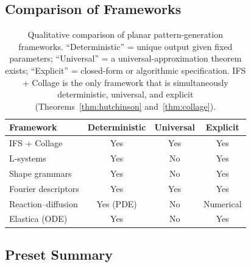 \documentclass[10pt]{amsart}
\theoremstyle{break}
\begin{document}
\subsection{Comparison of Frameworks}

\begin{table}[H]
	\centering
	{\fontsize{8}{10}\selectfont
		\begin{tabular}{|l|c|c|c|}
			\hline
			\textbf{Framework} & \textbf{Deterministic} & \textbf{Universal} & \textbf{Explicit} \\
			\hline
			IFS + Collage        & Yes       & Yes       & Yes \\
			L-systems            & Yes       & No        & Yes \\
			Shape grammars       & Yes       & No        & Yes \\
			Fourier descriptors  & Yes       & Yes       & Yes \\
			Reaction--diffusion  & Yes (PDE) & No        & Numerical \\
			Elastica (ODE)       & Yes       & No        & Yes \\
			\hline
	\end{tabular}}
	\caption{%
		Qualitative comparison of planar pattern-generation frameworks.
		``Deterministic'' = unique output given fixed parameters;
		``Universal'' = a universal-approximation theorem exists;
		``Explicit'' = closed-form or algorithmic specification.
		IFS + Collage is the only framework that is simultaneously
		deterministic, universal, and explicit (Theorems~\ref{thm:hutchinson}
		and~\ref{thm:collage}).%
	}
	\label{tab:framework-comparison}
\end{table}

\subsection{Preset Summary}
\end{document}
